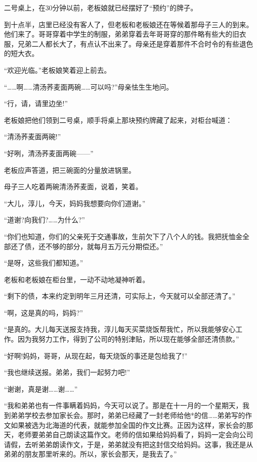 \documentclass[UTF8,a4paper,8pt]{ctexbook}
\begin{document}
			  二号桌上，在30分钟以前，老板娘就已经摆好了“预约”的牌子。
			  
			  到十点半，店里已经没有客人了，但老板和老板娘还在等候着那母子三人的到来。他们来了。哥哥穿着中学生的制服，弟弟穿着去年哥哥穿的那件略有些大的旧衣服，兄弟二人都长大了，有点认不出来了。母亲还是穿着那件不合时令的有些退色的短大衣。
			  
			  “欢迎光临。”老板娘笑着迎上前去。
			  
			  “……啊……清汤荞麦面两碗……可以吗?”母亲怯生生地问。
			  
			  “行，请，请里边坐!”
			  
			  老板娘把他们领到二号桌，顺手将桌上那块预约牌藏了起来，对柜台喊道：
			  
			  “清汤荞麦面两碗!”
			  
			  “好咧，清汤荞麦面两碗——”
			  
			  老板应声答道，把三碗面的分量放进锅里。
			  
			  母子三人吃着两碗清汤荞麦面，说着，笑着。
			  
			  “大儿，淳儿，今天，妈妈我想要向你们道谢。”
			  
			  “道谢?向我们?……为什么?”
			  
			  “你们也知道，你们的父亲死于交通事故，生前欠下了八个人的钱。我把抚恤金全部还了债，还不够的部分，就每月五万元分期偿还。”
			  
			  “是呀，这些我们都知道。”
			  
			  老板和老板娘在柜台里，一动不动地凝神听着。
			  
			  “剩下的债，本来约定到明年三月还清，可实际上，今天就可以全部还清了。”
			  
			  “啊，这是真的吗，妈妈?”
			  
			  “是真的。大儿每天送报支持我，淳儿每天买菜烧饭帮我忙，所以我能够安心工作。因为我努力工作，得到了公司的特别津贴，所以现在能够全部还清债款。”
			  
			  “好啊!妈妈，哥哥，从现在起，每天烧饭的事还是包给我了!”
			  
			  “我也继续送报。弟弟，我们一起努力吧!”
			  
			  “谢谢，真是谢……谢……”
			  
			  “我和弟弟也有一件事瞒着妈妈，今天可以说了。那是在十一月的一个星期天，我到弟弟学校去参加家长会。那时，弟弟已经藏了一封老师给他*的信……弟弟写的作文如果被选为北海道的代表，就能参加全国的作文比赛。正因为这样，家长会的那天，老师要弟弟自己朗读这篇作文。老师的信如果给妈妈看了，妈妈一定会向公司请假，去听弟弟朗读作文，于是，弟弟就没有把这封信交给妈妈。这事，我还是从弟弟的朋友那里听来的。所以，家长会那天，是我去了。”
			  
\end{document}
